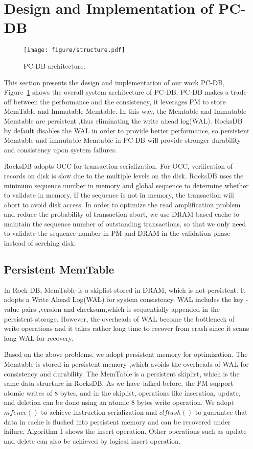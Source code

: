 \section{Design and Implementation of PC-DB}

    \begin{figure}
        \centering
        \texttt{[image: figure/structure.pdf]}
        \caption{PC-DB architecture.}
        \label{fig:structure}
    \end{figure}
This section presents the design and implementation of our work PC-DB, Figure~\ref{fig:structure} shows the overall system architecture of PC-DB. PC-DB makes a trade-off between the performance and the consistency, it leverages PM to store MemTable and Immutable Memtable. 
In this way, the Memtable and Immutable Memtable are persistent ,thus eliminating the write ahead log(WAL). 
RocksDB ~\cite{RocksDB} by default disables the WAL in order to provide better performance, 
so persistent Memtable and immutable Memtable in PC-DB will provide stronger durability and consistency upon system failures.

RocksDB adopts OCC for transaction serialization.
For OCC, verification of records on disk is slow due to the multiple levels on the disk. 
RocksDB uses the minimum sequence number in memory and global sequence to determine whether to validate in memory. 
If the sequence is not in memory, the transaction will abort to avoid disk access.
In order to optimize the read amplification problem and reduce the probability of transaction abort, 
we use DRAM-based cache to maintain the sequence number of outstanding transactions, 
so that we only need to validate the sequence number in PM and DRAM in the validation phase instead of serching disk.




\subsection{Persistent MemTable}
In Rock-DB, MemTable is a skiplist stored in DRAM, which is not persistent. 
It adopts a Write Ahead Log(WAL) for system consistency.
WAL includes the key -value pairs ,version and checksum,which is sequentially appended in the persistent storage. 
However, the overheads of WAL become the bottleneck of write operations and it takes rather long time to recover from crash since it scans long WAL for recovery.

Based on the above problems, we adopt persistent memory for optimization. 
The Memtable is stored in persistent memory ,which avoids the overheads of WAL for consistency and durability. 
The MemTable is a persistent skiplist, which is the same data structure in  RocksDB. As we have talked before, the PM support atomic writes of 8 bytes, and in the skiplist, operations like inseration, update, and deletion can be done using an atomic 8 bytes write operation.
We adopt  $mfence()$ to achieve instruction serialization and $clflush()$ to guarantee that data in cache is flushed into persistent memory and can be recovered under failure. 
Algorithm 1 shows the insert operation. Other operations such as update and delete can also be achieved by logical insert operation.

